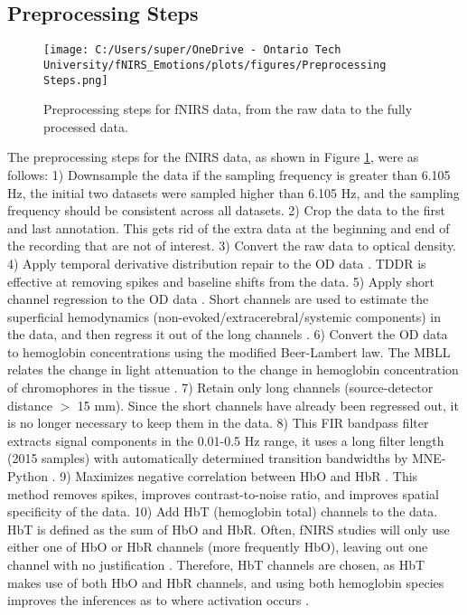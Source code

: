 \subsection{Preprocessing Steps}
\begin{figure}[H]
    \centering
    \texttt{[image: C:/Users/super/OneDrive - Ontario Tech University/fNIRS\_Emotions/plots/figures/Preprocessing Steps.png]}
    \caption[Preprocessing steps for fNIRS data]{Preprocessing steps for fNIRS data, from the raw data to the fully processed data. }
    \label{fig:preprocessing_steps}
\end{figure}

The preprocessing steps for the fNIRS data, as shown in Figure \ref{fig:preprocessing_steps}, were as follows:
1) Downsample the data if the sampling frequency is greater than 6.105 Hz, the initial two datasets were sampled higher than 6.105 Hz, and the sampling frequency should be consistent across all datasets.
2) Crop the data to the first and last annotation. This gets rid of the extra data at the beginning and end of the recording that are not of interest.
3) Convert the raw data to optical density.
4) Apply temporal derivative distribution repair to the OD data \citep{fishburn_temporal_2019}. TDDR is effective at removing spikes and baseline shifts from the data. 
5) Apply short channel regression to the OD data \citep{scholkmann_measuring_2014}. Short channels are used to estimate the superficial hemodynamics (non-evoked/extracerebral/systemic components) in the data, and then regress it out of the long channels \citep{tachtsidis_false_2016}. 
6) Convert the OD data to hemoglobin concentrations using the modified Beer-Lambert law. The MBLL relates the change in light attenuation to the change in hemoglobin concentration of chromophores in the tissue \citep{kocsis_modified_2006}.
7) Retain only long channels (source-detector distance $>$ 15 mm). Since the short channels have already been regressed out, it is no longer necessary to keep them in the data.
8) This FIR bandpass filter extracts signal components in the 0.01-0.5 Hz range, it uses a long filter length (2015 samples) with automatically determined transition bandwidths by MNE-Python \citep{pinti_current_2019}. 
9) Maximizes negative correlation between HbO and HbR \citep{cui_functional_2010}. This method removes spikes, improves contrast-to-noise ratio, and improves spatial specificity of the data.
10) Add HbT (hemoglobin total) channels to the data. HbT is defined as the sum of HbO and HbR. Often, fNIRS studies will only use either one of HbO or HbR channels (more frequently HbO), leaving out one channel with no justification \citep{kinder_systematic_2022}. Therefore, HbT channels are chosen, as HbT makes use of both HbO and HbR channels, and using both hemoglobin species improves the inferences as to where activation occurs \cite{hocke_automated_2018}.

